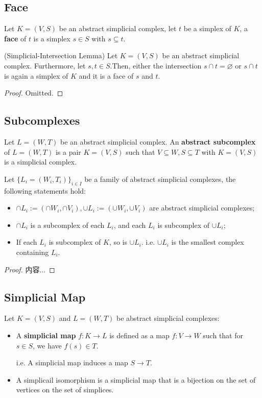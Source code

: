 \documentclass[Total.tex]{subfiles}
\begin{document}
			\subsection{Face}
			\begin{Def}
				Let $K=(V,S)$ be an abstract simplicial complex, let $t$ be a simplex of $K$, a \textbf{face} of $t$ is a simplex $s\in S$ with $s\subseteq t$.
			\end{Def}
			
			\begin{lemma}
				(Simplicial-Intersection Lemma) Let $K=(V,S)$ be an abstract simplicial complex. Furthermore, let $s,t\in S$.Then, either the intersection $s\cap t=\varnothing$ or $s\cap t$ is again a simplex of $K$ and it is a face of $s$ and $t$.
			\end{lemma}
			\begin{proof}
				Omitted.
			\end{proof}
			
			\subsection{Subcomplexes}
			\begin{Def}
				Let $L=(W,T)$ be an abstract simplicial complex. An \textbf{abstract subcomplex} of $L=(W,T)$ is a pair $K=(V,S)$ such that $V\subseteq W,S\subseteq T$ with $K=(V,S)$ is a simplicial complex.
			\end{Def}
			\begin{lemma}
				Let $\{L_i=(W_i,T_i)\}_{i\in I}$ be a family of abstract simplicial complexes, the following statements hold:
				\begin{itemize}
					\item $\cap L_i:=(\cap W_i,\cap V_i),\cup L_i:=(\cup W_i,\cup V_i)$
					are abstract simplicial complexes;
					\item $\cap L_i$ is a subcomplex of each $L_i$, and each $L_i$ is subcomplex of $\cup L_i$;
					\item If each $L_i$ is subcomplex of $K$, so is $\cup L_i$. i.e. $\cup L_i$ is the smallest complex containing $L_i$.
				\end{itemize}
			\end{lemma}
			\begin{proof}
				内容...
			\end{proof}
			
			\subsection{Simplicial Map}
			\begin{Def}
				Let $K=(V,S)$ and $L=(W,T)$ be abstract simplicial complexes:
				\begin{itemize}
					\item A \textbf{simplicial map} $f:K\rightarrow L$ is defined as a map $f:V\rightarrow W$ such that for $s\in S$, we have $f(s)\in T$.
					
					i.e. A simplicial map induces a map $S\rightarrow T$.
					\item A simplicail isomorphism is a simplicial map that is a bijection on the set of vertices on the set of simplices.
				\end{itemize}
			\end{Def}
\end{document}
